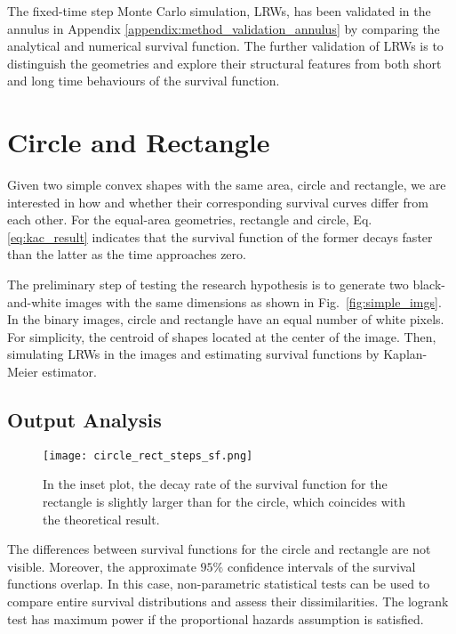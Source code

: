 

The fixed-time step Monte Carlo simulation, LRWs, has been validated
in the annulus in Appendix \ref{appendix:method_validation_annulus} by
comparing the analytical and numerical survival function. The further
validation of LRWs is to distinguish the geometries and explore their
structural features from both short and long time behaviours of the
survival function.



\section{Circle and Rectangle}

Given two simple convex shapes with the same area, circle and
rectangle, we are interested in how and whether their corresponding
survival curves differ from each other. For the equal-area geometries,
rectangle and circle, Eq. \ref{eq:kac_result} indicates that the
survival function of the former decays faster than the latter as the
time approaches zero.

The preliminary step of testing the research hypothesis is to generate
two black-and-white images with the same dimensions as shown in
Fig.~\ref{fig:simple_imgs}. In the binary images, circle and rectangle
have an equal number of white pixels. For simplicity, the centroid of
shapes located at the center of the image. Then, simulating LRWs in
the images and estimating survival functions by Kaplan-Meier
estimator.


 \subsection{Output Analysis}
 
   \begin{figure}
     \centering
     \texttt{[image: circle\_rect\_steps\_sf.png]}
     \label{fig:sf_simple_shape_steps}
     \caption{In the inset plot, the decay rate of the survival function for the rectangle is slightly larger than for the circle, which coincides with the theoretical result.}
   \end{figure}

  The differences between survival functions for the circle and
  rectangle are not visible. Moreover, the approximate $95\%$
  confidence intervals of the survival functions overlap. In this
  case, non-parametric statistical tests can be used to compare entire
  survival distributions and assess their dissimilarities. The logrank
  test has maximum power if the proportional hazards assumption is
  satisfied. 

